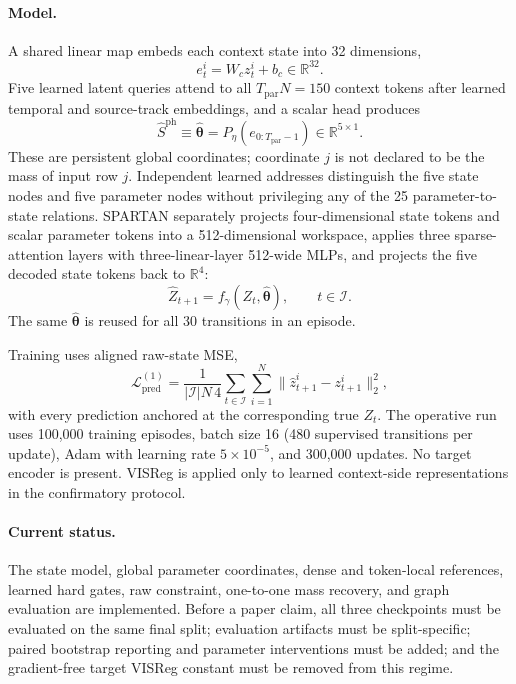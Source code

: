 \paragraph{Model.}
A shared linear map embeds each context state into 32 dimensions,
\begin{equation}
    e_t^i=W_c z_t^i+b_c\in\mathbb{R}^{32}.
\end{equation}
Five learned latent queries attend to all $T_{\mathrm{par}}N=150$ context tokens after learned
temporal and source-track embeddings, and a scalar head produces
\begin{equation}
    \widehat{S}^{\mathrm{ph}}
    \equiv\widehat{\boldsymbol\theta}
    =P_\eta(e_{0:T_{\mathrm{par}}-1})\in\mathbb{R}^{5\times1}.
    \label{eq:experiment-one-parameters}
\end{equation}
These are persistent global coordinates; coordinate $j$ is not declared to be the mass of input
row $j$.  Independent learned addresses distinguish the five state nodes and five parameter
nodes without privileging any of the 25 parameter-to-state relations.  SPARTAN separately
projects four-dimensional state tokens and scalar parameter tokens into a 512-dimensional
workspace, applies three sparse-attention layers with three-linear-layer 512-wide MLPs, and
projects the five decoded state tokens back to $\mathbb{R}^{4}$:
\begin{equation}
    \widehat Z_{t+1}
      =f_\gamma(Z_t,\widehat{\boldsymbol\theta}),
    \qquad t\in\mathcal I.
    \label{eq:experiment-one-predictor}
\end{equation}
The same $\widehat{\boldsymbol\theta}$ is reused for all 30 transitions in an episode.

Training uses aligned raw-state MSE,
\begin{equation}
    \mathcal{L}^{(1)}_{\mathrm{pred}}
    =\frac{1}{|\mathcal I|N\,4}
      \sum_{t\in\mathcal I}\sum_{i=1}^{N}
      \lVert\widehat z_{t+1}^i-z_{t+1}^i\rVert_2^2,
    \label{eq:experiment-one-loss}
\end{equation}
with every prediction anchored at the corresponding true $Z_t$.  The operative run uses 100,000
training episodes, batch size 16 (480 supervised transitions per update), Adam with learning rate
$5\times10^{-5}$, and 300,000 updates.  No target encoder is present.  VISReg is applied only to
learned context-side representations in the confirmatory protocol.

\paragraph{Current status.}
The state model, global parameter coordinates, dense and token-local references, learned hard
gates, raw constraint, one-to-one mass recovery, and graph evaluation are implemented.  Before a
paper claim, all three checkpoints must be evaluated on the same final split; evaluation artifacts
must be split-specific; paired bootstrap reporting and parameter interventions must be added; and
the gradient-free target VISReg constant must be removed from this regime.


